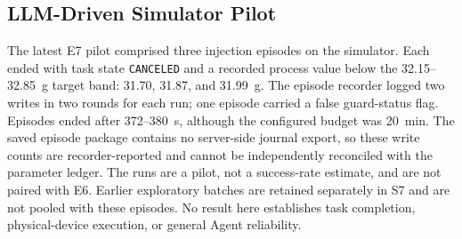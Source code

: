\subsection{LLM-Driven Simulator Pilot}
\label{sec:eval-agent}
The latest E7 pilot comprised three injection episodes on the simulator. Each ended with task state \texttt{CANCELED} and a recorded process value below the 32.15--32.85~g target band: 31.70, 31.87, and 31.99~g. The episode recorder logged two writes in two rounds for each run; one episode carried a false guard-status flag. Episodes ended after 372--380~s, although the configured budget was 20~min. The saved episode package contains no server-side journal export, so these write counts are recorder-reported and cannot be independently reconciled with the parameter ledger. The runs are a pilot, not a success-rate estimate, and are not paired with E6. Earlier exploratory batches are retained separately in S7 and are not pooled with these episodes. No result here establishes task completion, physical-device execution, or general Agent reliability.
